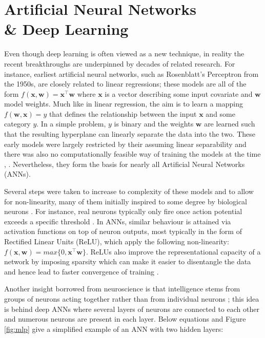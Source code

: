 \documentclass[12pt]{report}
\begin{document}
\section{Artificial Neural Networks \\ \& Deep Learning}
Even though deep learning is often viewed as a new technique, in reality the recent breakthroughs are underpinned by decades of related research. For instance, earliest artificial neural networks, such as Rosenblatt's Perceptron \cite{Rosenblatt1958} from the 1950s, are closely related to linear regressions; these models are all of the form $f(\mathbf{x}, \mathbf{w})=\mathbf{x}^{\intercal} \mathbf{w}$ where $\mathbf{x}$ is a vector describing some input covariate and $\mathbf{w}$ model weights. Much like in linear regression, the aim is to learn a mapping $f(\mathbf{w}, \mathbf{x}) = y$ that defines the relationship between the input $\mathbf{x}$ and some category $y$. In a simple problem, $y$ is binary and the weights $\mathbf{w}$ are learned such that the resulting hyperplane can linearly separate the data into the two. These early models were largely restricted by their assuming linear separability and there was also no computationally feasible way of training the models at the time \cite{Goodfellow2016}, \cite{JurgenSchmidhuber2015}. Nevertheless, they form the basis for nearly all Artificial Neural Networks (ANNs). 

Several steps were taken to increase to complexity of these models and to allow for non-linearity, many of them initially inspired to some degree by biological neurons \cite{Goodfellow16}. For instance, real neurons typically only fire once action potential exceeds a specific threshold \cite{Hodgkin1990}. In ANNs, similar behaviour is attained via activation functions on top of neuron outputs, most typically in the form of Rectified Linear Units (ReLU), which apply the following non-linearity: $f(\mathbf{x}, \mathbf{w})=max\{0, \mathbf{x}^{\intercal} \mathbf{w}\}$. ReLUs also improve the representational capacity of a network by imposing sparsity which can make it easier to disentangle the data \cite{Glorot2011} and hence lead to faster convergence of training \cite{Krizhevsky2012}.

Another insight borrowed from neuroscience is that intelligence stems from groups of neurons acting together rather than from individual neurons \cite{Goodfellow2016}; this idea is behind deep ANNs where several layers of neurons are connected to each other and numerous neurons are present in each layer. Below equations and Figure \ref{fig:mlp} give a simplified example of an ANN with two hidden layers:
\end{document}
